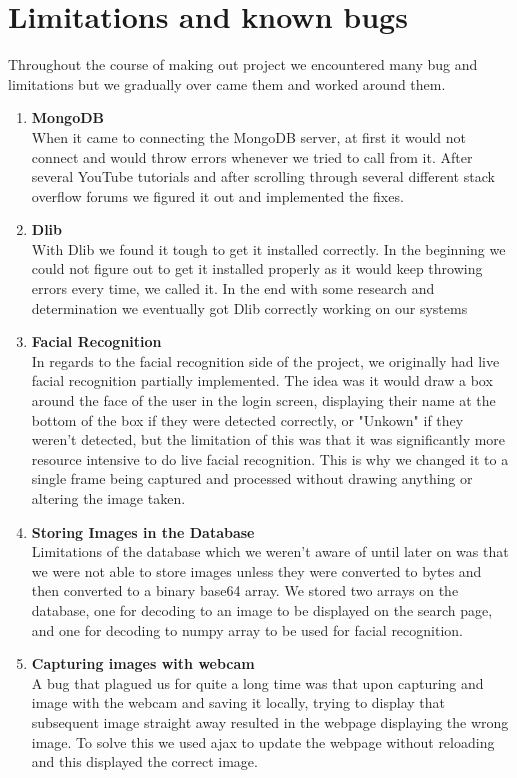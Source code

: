 \documentclass{article}
\begin{document}
\newpage

\section{Limitations and known bugs}
Throughout the course of making out project we encountered many bug and limitations but we gradually over came them and worked around them.
\begin{enumerate}
\item \textbf{MongoDB} \\
When it came to connecting the MongoDB server, at first it would not connect and would throw errors whenever we tried to call from it. After several YouTube tutorials and after scrolling through several different stack overflow forums we figured it out and implemented the fixes. 
\item \textbf{Dlib} \\
With Dlib we found it tough to get it installed correctly. In the beginning we could not figure out to get it installed properly as it would keep throwing errors every time, we called it. In the end with some research and determination we eventually got Dlib correctly working on our systems
\item \textbf{Facial Recognition} \\
In regards to the facial recognition side of the project, we originally had live facial recognition partially implemented. The idea was it would draw a box around the face of the user in the login screen, displaying their name at the bottom of the box if they were detected correctly, or "Unkown" if they weren't detected, but the limitation of this was that it was significantly more resource intensive to do live facial recognition. This is why we changed it to a single frame being captured and processed without drawing anything or altering the image taken.
\item \textbf{Storing Images in the Database} \\
Limitations of the database which we weren't aware of until later on was that we were not able to store images unless they were converted to bytes and then converted to a binary base64 array. We stored two arrays on the database, one for decoding to an image to be displayed on the search page, and one for decoding to numpy array to be used for facial recognition.
\item \textbf{Capturing images with webcam} \\
A bug that plagued us for quite a long time was that upon capturing and image with the webcam and saving it locally, trying to display that subsequent image straight away resulted in the webpage displaying the wrong image. To solve this we used ajax to update the webpage without reloading and this displayed the correct image.

\end{enumerate}
\end{document}
